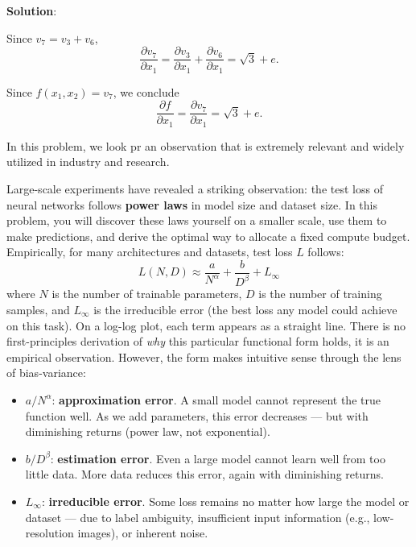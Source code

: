 \documentclass[submit]{harvardml}
\newenvironment{solution}{
    \vspace{2mm}
    \color{blue}\noindent\textbf{Solution}:
}{}
\begin{document}
\begin{solution}
\begin{enumerate}
\begin{enumerate}
        Since $v_7 = v_3 + v_6$,
        \[
        \frac{\partial v_7}{\partial x_1}
        =
        \frac{\partial v_3}{\partial x_1} + \frac{\partial v_6}{\partial x_1}
        =
        \sqrt{3} + e.
        \]

        Since $f(x_1,x_2)=v_7$, we conclude
        \[
        \frac{\partial f}{\partial x_1}
        =
        \frac{\partial v_7}{\partial x_1}
        =
        \sqrt{3} + e.
        \]
    \end{enumerate}
\end{enumerate}
\end{solution}


\newpage


\begin{problem}
In this problem, we look pr an observation that is extremely relevant and widely utilized in industry and research.

Large-scale experiments have revealed a striking observation: the test loss of neural networks follows \textbf{power laws} in model size and dataset size. In this problem, you will discover these laws yourself on a smaller scale, use them to make predictions, and derive the optimal way to allocate a fixed compute budget.
Empirically, for many architectures and datasets, test loss $L$ follows:
\begin{equation}\label{eq:scaling}
    L(N, D) \approx \frac{a}{N^{\alpha}} + \frac{b}{D^{\beta}} + L_{\infty}
\end{equation}
where $N$ is the number of trainable parameters, $D$ is the number of training samples, and $L_\infty$ is the irreducible error (the best loss any model could achieve on this task). On a log-log plot, each term appears as a straight line.
There is no first-principles derivation of \emph{why} this particular functional form holds, it is an empirical observation. However, the form makes intuitive sense through the lens of bias-variance:
\begin{itemize}
    \item $a / N^\alpha$: \textbf{approximation error}. A small model cannot represent the true function well. As we add parameters, this error decreases --- but with diminishing returns (power law, not exponential).
    \item $b / D^\beta$: \textbf{estimation error}. Even a large model cannot learn well from too little data. More data reduces this error, again with diminishing returns.
    \item $L_\infty$: \textbf{irreducible error}. Some loss remains no matter how large the model or dataset --- due to label ambiguity, insufficient input information (e.g., low-resolution images), or inherent noise.
\end{itemize}

\end{problem}
\end{document}
